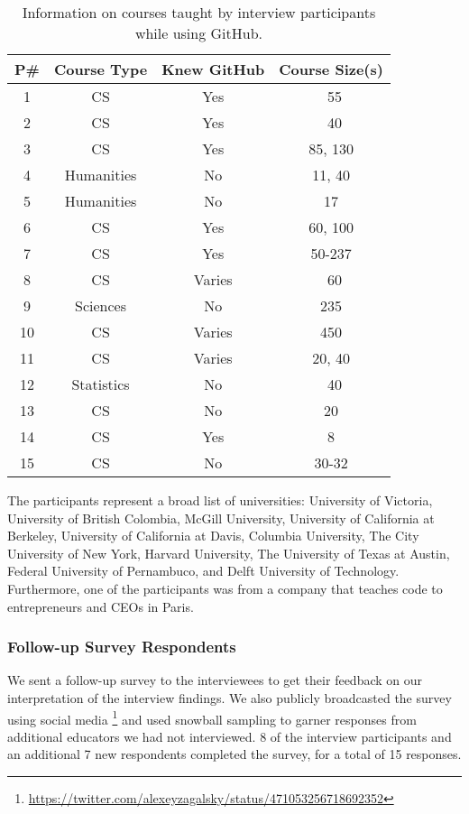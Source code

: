 \begin{table}[h]
    \vspace{1pt}
        \caption{Information on courses taught by interview participants while using GitHub.}\label{table:interviews:github_tutorial}
    \vspace{1pt}
    \begin{center}
        \begin{tabular}{cccc}
            \hline
            P\# & \multicolumn{1}{|c}{Course Type} & \multicolumn{1}{|c}{Knew GitHub} & \multicolumn{1}{|c}{Course Size(s)} \\
            \hline
            1 & CS & Yes & ~55 \\
            2 & CS & Yes & ~40 \\
            3 & CS & Yes & 85, 130 \\
            4 & Humanities & No & 11, 40 \\
            5 & Humanities & No & 17 \\
            6 & CS & Yes & 60, 100 \\
            7 & CS & Yes & 50-237 \\
            8 & CS & Varies & ~60 \\
            9 & Sciences & No & 235 \\
            10 & CS & Varies & 450 \\
            11 & CS & Varies & 20, 40 \\
            12 & Statistics & No & ~40 \\
            13 & CS & No & 20 \\
            14 & CS & Yes & 8 \\
            15 & CS & No & 30-32
        \end{tabular}
    \end{center}
\end{table}
The participants represent a broad list of universities: University of Victoria, University of British Colombia, McGill University, University of California at Berkeley, University of California at Davis, Columbia University, The City University of New York, Harvard University, The University of Texas at Austin, Federal University of Pernambuco, and Delft University of Technology. Furthermore, one of the participants was from a company that teaches code to entrepreneurs and CEOs in Paris.

\subsubsection{Follow-up Survey Respondents}
We sent a follow-up survey to the interviewees to get their feedback on our interpretation of the interview findings. We also publicly broadcasted the survey using social media \footnote{\url{https://twitter.com/alexeyzagalsky/status/471053256718692352}} and used snowball sampling to garner responses from additional educators we had not interviewed. 8 of the interview participants and an additional 7 new respondents completed the survey, for a total of 15 responses.

